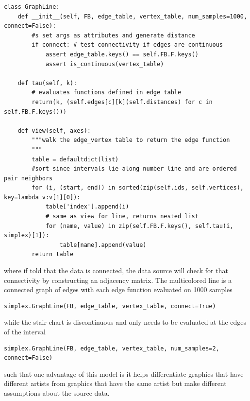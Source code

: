 \documentclass[../main.tex]{subfiles}
\begin{document}
\begin{verbatim}
class GraphLine:
    def __init__(self, FB, edge_table, vertex_table, num_samples=1000, connect=False):
        #s set args as attributes and generate distance
        if connect: # test connectivity if edges are continuous
            assert edge_table.keys() == self.FB.F.keys()
            assert is_continuous(vertex_table)

    def tau(self, k):
        # evaluates functions defined in edge table
        return(k, (self.edges[c][k](self.distances) for c in self.FB.F.keys()))

    def view(self, axes):
        """walk the edge_vertex table to return the edge function
        """
        table = defaultdict(list)
        #sort since intervals lie along number line and are ordered pair neighbors
        for (i, (start, end)) in sorted(zip(self.ids, self.vertices), key=lambda v:v[1][0]):
            table['index'].append(i)
            # same as view for line, returns nested list
            for (name, value) in zip(self.FB.F.keys(), self.tau(i, simplex)[1]):
                table[name].append(value)
        return table
\end{verbatim}
where if told that the data is connected, the data source will check for that connectivity by constructing an adjacency matrix. The multicolored line is a connected graph of edges with each edge function evaluated on 1000 samples 
\begin{verbatim}
simplex.GraphLine(FB, edge_table, vertex_table, connect=True)
\end{verbatim}
while the stair chart is discontinuous and only needs to be evaluated at the edges of the interval 
\begin{verbatim}
simplex.GraphLine(FB, edge_table, vertex_table, num_samples=2, connect=False)
\end{verbatim}
such that one advantage of this model is it helps differentiate graphics that have different artists from graphics that have the same artist but make different assumptions about the source data. 
\end{document}
